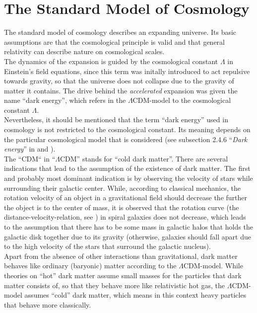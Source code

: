 \chapter{The Standard Model of Cosmology}
\label{chap:the-standard-model-of-cosmology}
\thispagestyle{empty}

\noindent The standard model of cosmology describes an expanding universe. Its basic assumptions are that the cosmological principle is valid and that general relativity can describe nature on cosmological scales. \\

\noindent The dynamics of the expansion is guided by the cosmological constant $\Lambda$ in Einstein's field equations, since this term was initally introduced to act repulsive towards gravity, so that the universe does not collapse due to the gravity of matter it contains. The drive behind the \textit{accelerated} expansion was given the name ``dark energy'', which refers in the $\Lambda$CDM-model to the cosmological constant $\Lambda$. \\ 
Nevertheless, it should be mentioned that the term ``dark energy'' used in cosmology is not restricted to the cosmological constant. Its meaning depends on the particular cosmological model that is considered (see subsection 2.4.6 ``\textit{Dark energy}'' in \cite[p.~50]{Dodelson2020} and \cite{Frieman2008}). \\

\noindent The ``CDM`` in ``$\Lambda$CDM'' stands for ``cold dark matter''. There are several indications that lead to the assumption of the existence of dark matter. The first and probably most dominant indication is by observing the velocity of stars while surrounding their galactic center. While, according to classical mechanics, the rotation velocity of an object in a gravitational field should decrease the further the object is to the center of mass, it is observed that the rotation curve (the distance-velocity-relation, see \cite[p.~64]{Schneider2006}) in spiral galaxies does not decrease, which leads to the assumption that there has to be some mass in galactic halos that holds the galactic disk together due to its gravity (otherwise, galaxies should fall apart due to the high velocity of the stars that surround the galactic nucleus). \\
Apart from the absence of other interactions than gravitational, dark matter behaves like ordinary (baryonic) matter according to the $\Lambda$CDM-model. While theories on ``hot'' dark matter assume small masses for the particles that dark matter consists of, so that they behave more like relativistic hot gas, the $\Lambda$CDM-model assumes ``cold'' dark matter, which means in this context heavy particles that behave more classically. \\

